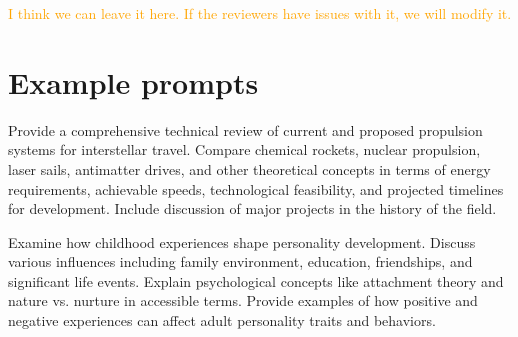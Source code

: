 \documentclass[aip%
 aip,
 amsmath,amssymb,
 reprint,%
]{revtex4-1}
\newcommand{\orange}[1]{\textcolor{orange}{#1}}
\begin{document}
\orange{I think we can leave it here. If the reviewers have issues with it, we will modify it.}

\section{Example prompts}
\label{sec:ex_prompt}

\begin{promptblock}
Provide a comprehensive technical review of current and proposed propulsion systems for interstellar travel. Compare chemical rockets, nuclear propulsion, laser sails, antimatter drives, and other theoretical concepts in terms of energy requirements, achievable speeds, technological feasibility, and projected timelines for development. Include discussion of major projects in the history of the field.
\end{promptblock}



\begin{promptblock}
Examine how childhood experiences shape personality development. Discuss various influences including family environment, education, friendships, and significant life events. Explain psychological concepts like attachment theory and nature vs. nurture in accessible terms. Provide examples of how positive and negative experiences can affect adult personality traits and behaviors.
\end{promptblock}
\end{document}
